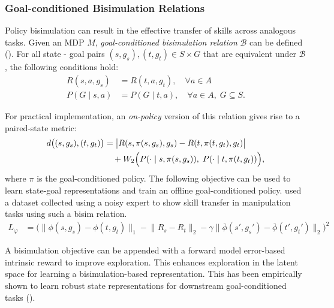 \documentclass{article}
\begin{document}
\subsubsection{Goal-conditioned Bisimulation Relations}
Policy bisimulation can result in the effective transfer of skills across analogous tasks. Given an MDP $M$, \emph{goal-conditioned bisimulation relation}  $\mathcal{B}$ can be defined (\cite{hansen2022bisimulation}). For all state - goal pairs $(s, g_s), (t, g_t) \in S \times G$ that are equivalent under 
$\mathcal{B}$, the following conditions hold:
\begin{align}
    R(s, a, g_s) &= R(t, a, g_t), \quad \forall a \in A \label{eq:reward-cond} \\
    P(G \mid s, a) &= P(G \mid t, a), \quad \forall a \in A, \; G \subseteq S. \label{eq:transition-cond}
\end{align}

For practical implementation, an \emph{on-policy} version of this relation gives rise to a paired-state metric:
\begin{align}
    d\big((s,g_s), (t,g_t)\big) 
    &= \big| R(s, \pi(s,g_s), g_s) - R(t, \pi(t,g_t), g_t) \big| \notag \\
    &\quad + W_2 \Big( P(\cdot \mid s, \pi(s,g_s)), \;
    P(\cdot \mid t, \pi(t,g_t)) \Big), \label{eq:metric}
\end{align}
where $\pi$ is the goal-conditioned policy. The following objective can be used to learn state-goal representations and train an offline goal-conditioned policy. 
\cite{hansen2022bisimulation} used a dataset collected using a noisy expert to show skill transfer in manipulation tasks using such a bisim relation. 
\begin{align}
L_{\varphi} &= \biggl( \bigl\|
    \phi(s, g_s) - \phi(t, g_t)
\bigr\|_1
- \bigl\| R_s - R_t \bigr\|_2
- \gamma \bigl\|
    \overline{\phi}(s', g_s') - \overline{\phi}(t', g_t')
\bigr\|_2
\biggr)^2
\end{align}

A bisimulation objective can be appended with a forward model error-based intrinsic reward to improve exploration. This enhances exploration in the latent space for learning a bisimulation-based representation. This has been empirically shown to learn robust state representations for downstream goal-conditioned tasks (\cite{kemertas2021towards}). 
\end{document}
